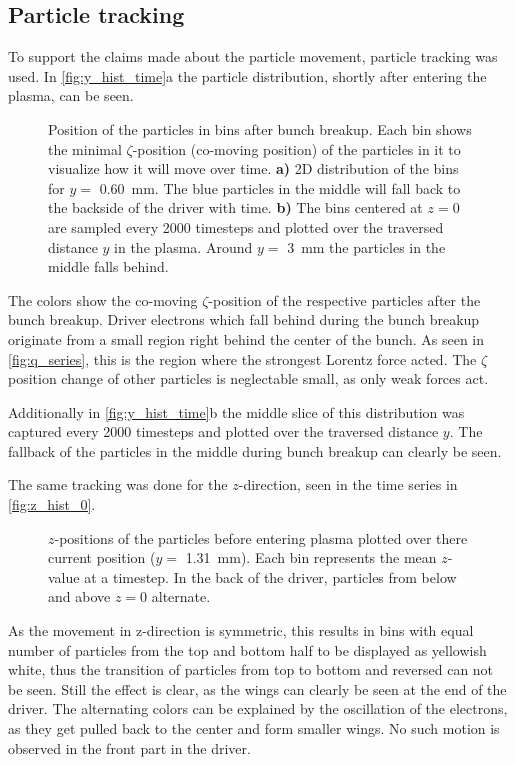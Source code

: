 \documentclass[bachelor_thesis]{subfiles}
\begin{document}
\subsection{Particle tracking}
To support the claims made about the particle movement, particle tracking was used. In \autoref{fig:y_hist_time}a the particle distribution, shortly after entering the plasma, can be seen.
\begin{figure}
	\centering
	
	\caption{Position of the particles in bins after bunch breakup. Each bin shows the minimal $\zeta$-position (co-moving position) of the particles in it to visualize how it will move over time.
	\textbf{a)} 2D distribution of the bins for $y=$ \qty{0.60}{\mm}. The blue particles in the middle will fall back to the backside of the driver with time.
	\textbf{b)} The bins centered at $z=0$ are sampled every 2000 timesteps and plotted over the traversed distance $y$ in the plasma. Around $y=$ \qty{3}{mm} the particles in the middle falls behind.}
	\label{fig:y_hist_time}
\end{figure}
The colors show the co-moving $\zeta$-position of the respective particles after the bunch breakup. Driver electrons which fall behind during the bunch breakup originate from a small region right behind the center of the bunch. 
As seen in \autoref{fig:q_series}, this is the region where the strongest Lorentz force acted.
The $\zeta$ position change of other particles is neglectable small, as only weak forces act.

Additionally in \autoref{fig:y_hist_time}b the middle slice of this distribution was captured every 2000 timesteps and plotted over the traversed distance $y$. The fallback of the particles in the middle during bunch breakup can clearly be seen.

The same tracking was done for the $z$-direction, seen in the time series in \autoref{fig:z_hist_0}.
\begin{figure}
	\centering
	
	\caption{$z$-positions of the particles before entering plasma plotted over there current position ($y=$ \qty{1.31}{mm}). Each bin represents the mean $z$-value at a timestep. In the back of the driver, 
	particles from below and above $z=0$ alternate. }
	\label{fig:z_hist_0}
\end{figure}
As the movement in z-direction is symmetric, this results in bins with equal number of particles from the top and bottom half to be displayed as yellowish white, thus the transition of particles from top to bottom and reversed can not be seen. Still the effect is clear, as the wings can clearly be seen at the end of the driver.
The alternating colors can be explained by the oscillation of the electrons, as they get pulled back to the center and form smaller wings. No such motion is observed in the front part in the driver.
\end{document}
